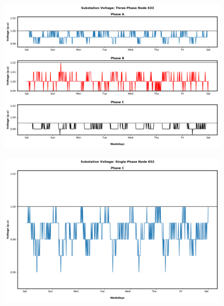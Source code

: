 \begin{figure}[H]
    \centering
    \includegraphics[width=1.1\columnwidth]{Pictures/twenty_three_phase_633_volt.png}
    \caption{ }
\end{figure}




\begin{figure}[H]
    \centering
    \includegraphics[width=1.1\columnwidth]{Pictures/fourty_single_phase_652_volt.png}
    \caption{ }
\end{figure}

\newpage

